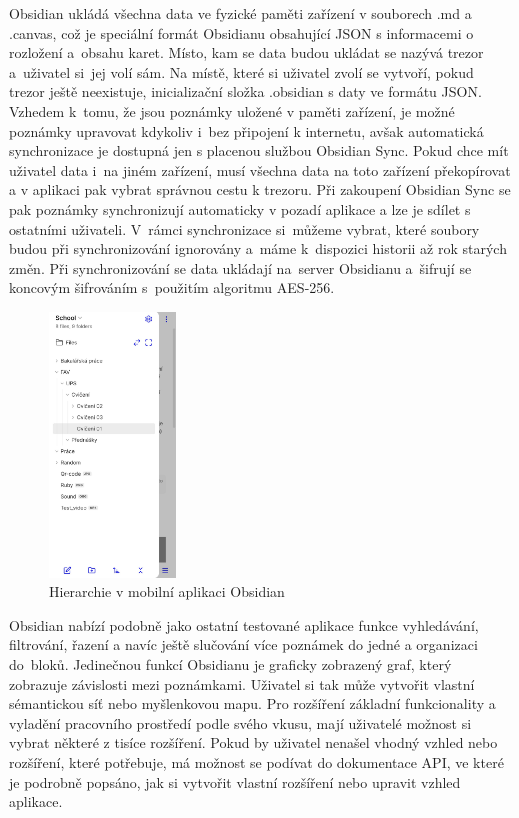 \documentclass[czech, bc, kiv, he, iso690numb]{fasthesis}
\begin{document}
Obsidian ukládá všechna data ve fyzické paměti zařízení v souborech .md a .canvas, což je speciální formát Obsidianu obsahující \gls{JSON} s informacemi o rozložení a~obsahu karet. Místo, kam se data budou ukládat se nazývá trezor a~uživatel si~jej volí sám. Na místě, které si uživatel zvolí se vytvoří, pokud trezor ještě neexistuje, inicializační složka .obsidian s daty ve formátu \gls{JSON}. Vzhedem k~tomu, že jsou poznámky uložené v paměti zařízení, je možné poznámky upravovat kdykoliv i~bez připojení k internetu, avšak automatická synchronizace je dostupná jen s placenou službou Obsidian Sync. Pokud chce mít uživatel data i~na jiném zařízení, musí všechna data na toto zařízení překopírovat a v aplikaci pak vybrat správnou cestu k trezoru. Při zakoupení Obsidian Sync se pak poznámky synchronizují automaticky v pozadí aplikace a lze je sdílet s ostatními uživateli. V~rámci synchronizace si~můžeme vybrat, které soubory budou při synchronizování ignorovány a~máme k~dispozici historii až rok starých změn. Při synchronizování se data ukládají na~server Obsidianu a~šifrují se koncovým šifrováním s~použitím algoritmu \gls{AES}-256.

\begin{figure}[h!]
  \centering
  \includegraphics[width=0.3\textwidth]{img/BP-Runt/Obsidian/Obsidian_hierarchie.jpg}
  \caption{Hierarchie v mobilní aplikaci Obsidian}
  \label{fig:hierarchy_obsidian}
\end{figure}

Obsidian nabízí podobně jako ostatní testované aplikace funkce vyhledávání, filtrování, řazení a navíc ještě slučování více poznámek do jedné a organizaci do~bloků. Jedinečnou funkcí Obsidianu je graficky zobrazený graf, který zobrazuje závislosti mezi poznámkami. Uživatel si tak může vytvořit vlastní sémantickou síť nebo myšlenkovou mapu. Pro rozšíření základní funkcionality a vyladění pracovního prostředí podle svého vkusu, mají uživatelé možnost si vybrat některé z tisíce rozšíření. Pokud by uživatel nenašel vhodný vzhled nebo rozšíření, které potřebuje, má možnost se podívat do dokumentace \gls{API}, ve které je podrobně popsáno, jak si vytvořit vlastní rozšíření nebo upravit vzhled aplikace.
\end{document}
